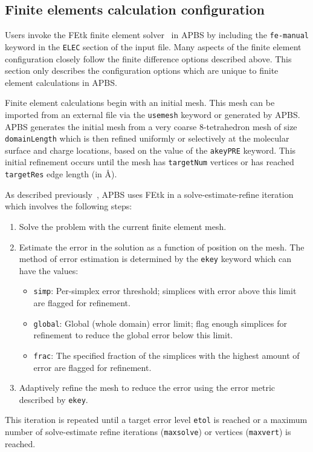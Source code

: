 \documentclass[12pt,titlepage]{article}
\newcommand{\keyword}[1]{\texttt{#1}}
\begin{document}
\subsection{Finite elements calculation configuration}
Users invoke the FEtk finite element solver~\cite{FEtk} in APBS by including the \keyword{fe-manual} keyword in the \keyword{ELEC} section of the input file.
Many aspects of the finite element configuration closely follow the finite difference options described above.
This section only describes the configuration options which are unique to finite element calculations in APBS.

Finite element calculations begin with an initial mesh.
This mesh can be imported from an external file via the \keyword{usemesh} keyword or generated by APBS.
APBS generates the initial mesh from a very coarse 8-tetrahedron mesh of size \keyword{domainLength} which is then refined uniformly or selectively at the molecular surface and charge locations, based on the value of the \keyword{akeyPRE} keyword.  
This initial refinement occurs until the mesh has \keyword{targetNum} vertices or has reached \keyword{targetRes} edge length (in \AA).

As described previously~\cite{Holst2000, Baker2000}, APBS uses FEtk in a solve-estimate-refine iteration which involves the following steps:
\begin{enumerate}
	\item Solve the problem with the current finite element mesh.
	\item Estimate the error in the solution as a function of position on the mesh.
	The method of error estimation is determined by the \keyword{ekey} keyword which can have the values:
	\begin{itemize}
		\item \keyword{simp}: Per-simplex error threshold; simplices with error above this limit are flagged for refinement.
		\item \keyword{global}: Global (whole domain) error limit; flag enough simplices for refinement to reduce the global error below this limit.
		\item \keyword{frac}: The specified fraction of the simplices with the highest amount of error are flagged for refinement.
	\end{itemize}
	\item Adaptively refine the mesh to reduce the error using the error metric described by \keyword{ekey}.
\end{enumerate}
This iteration is repeated until a target error level \keyword{etol} is reached or a maximum number of solve-estimate refine iterations (\keyword{maxsolve}) or vertices (\keyword{maxvert}) is reached.
\end{document}
